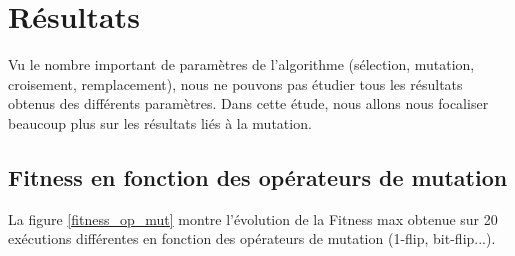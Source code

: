 \documentclass[12pt]{article}
\begin{document}
\section{Résultats}
\label{resultat_1}
Vu le nombre important de paramètres de l'algorithme (sélection, mutation, croisement, remplacement), nous ne pouvons pas étudier tous les résultats obtenus des différents paramètres. Dans cette étude, nous allons nous focaliser beaucoup plus sur les résultats liés à la mutation.

\subsection{Fitness en fonction des opérateurs de mutation} La figure \ref{fitness_op_mut} montre l'évolution de la Fitness max obtenue sur 20 exécutions différentes en fonction des opérateurs de mutation (1-flip, bit-flip...).
\end{document}
